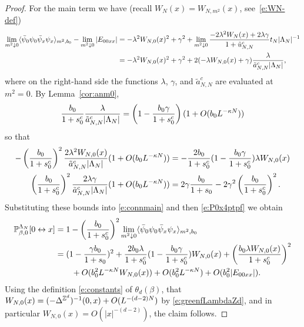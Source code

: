 \documentclass[11pt]{amsart}
\numberwithin{equation}{section}
\numberwithin{theorem}{section}
\newcommand{\conn}{\leftrightarrow}
\newcommand{\1}{{\bf 1}}
\newcommand{\clambda}{\lambda}
\newcommand{\cgamma}{\gamma}
\begin{document}
\begin{proof}
For the main term we have (recall $W_{N}(x)=W_{N,m^{2}}(x)$, see~\eqref{e:WN-def})
\begin{align}
  \lim_{m^{2}\downarrow 0}\avg{\bar\psi_0\psi_0\bar\psi_x\psi_x}_{m^2,b_0}
  - \lim_{m^2\downarrow 0} |E_{00xx}|
  &=
    -\clambda^2 W_{N,0}(x)^2 +\gamma^2
    +
    \lim_{m^{2}\downarrow 0}\frac{
    -2\clambda^2 W_{N}(x)
    + 2\clambda\gamma 
    }{1+\tilde u_{N,N}^c} {t_N|\Lambda_N|^{-1}}
    \nnb
  &=  -\clambda^2 W_{N,0}(x)^2 +\gamma^2
    + 2(-\clambda W_{N,0}(x)+\gamma)\frac{
    \clambda}{\tilde a_{N,N}^c|\Lambda_{N}|}
    ,
    \label{e:connmain}
\end{align}
where on the right-hand side the functions $\lambda$, $\gamma$, and $\tilde a_{N,N}^c$ are evaluated at $m^2=0$.
By Lemma~\ref{cor:anm0},
\begin{equation}
  \label{eq:1}
  \frac{b_{0}}{1+s_{0}^{c}}
  \frac{\clambda}{\tilde a_{N,N}^{c}|\Lambda_{N}| } =
  \pa{1-\frac{b_{0}\cgamma}{1+s_{0}^{c}}}
  (1+O(b_0L^{-\kappa N}))
\end{equation}
so that
\begin{align}
  \label{eq:5}
  -\pa{\frac{b_{0}}{1+s_{0}^{c}}}^{2}\frac{
  2\lambda^2 W_{N,0}(x)}{\tilde a_{N,N}^c|\Lambda_{N}|}
  { (1+O(b_0L^{-\kappa N}))}
  &= -\frac{2b_{0}}{1+s_{0}^{c}} 
    (1-\frac{b_{0}\cgamma}{1+s_{0}^{c}})\clambda W_{N,0}(x) 
  \\
  \pa{\frac{b_{0}}{1+s_{0}^{c}}}^{2}\frac{2\clambda\gamma 
  }{\tilde a_{N,N}^c|\Lambda_{N}|}
  { (1+O(b_0L^{-\kappa N}))}
  &= 2\cgamma
     \frac{b_{0}}{1+s_{0}} - 2\cgamma^{2}\pa{\frac{b_{0}}{1+s_{0}^{c}}}^{2}.
\end{align}
% 
Substituting these bounds into \eqref{e:connmain} and then  \eqref{e:P0x4ptpf} we obtain
\begin{align}
  \label{eq:2}
  \P_{\beta,0}^{\Lambda_N}[0\conn x]
  &=
  1-\pa{\frac{b_{0}}{1+s_{0}^{c}}}^{2}\lim_{m^{2}\downarrow
    0}\avg{\bar\psi_0\psi_0\bar\psi_x\psi_x}_{m^2,b_0}
    \nnb
  &= (1-\frac{\cgamma b_{0}}{1+s_{0}})^{2}
    +\frac{2b_{0}\clambda}{1+s_{0}^{c}} (1-\frac{b_{0}\cgamma}{1+s_{0}^{c}}) W_{N,0}(x)
    + \pa{\frac{b_{0}\clambda
    W_{N,0}(x)}{1+s_{0}^{c}}}^{2}
    \nnb
  &\qquad  +O(b_0^2 L^{-\kappa N} W_{N,0}(x))  + O(b_0^2 L^{-\kappa N})
    + O(b_0^2|E_{00xx}|).
\end{align}
Using the definition \eqref{e:constants} of $\theta_d(\beta)$,
that $W_{N,0}(x) = (-\Delta^{\mathbb{Z}^d})^{-1}(0,x)+O(L^{-(d-2)N})$ by   \eqref{e:greenfLambdaZd},
and in particular $W_{N,0}(x) = O(|x|^{-(d-2)})$,
the claim follows.
\end{proof}
\end{document}
